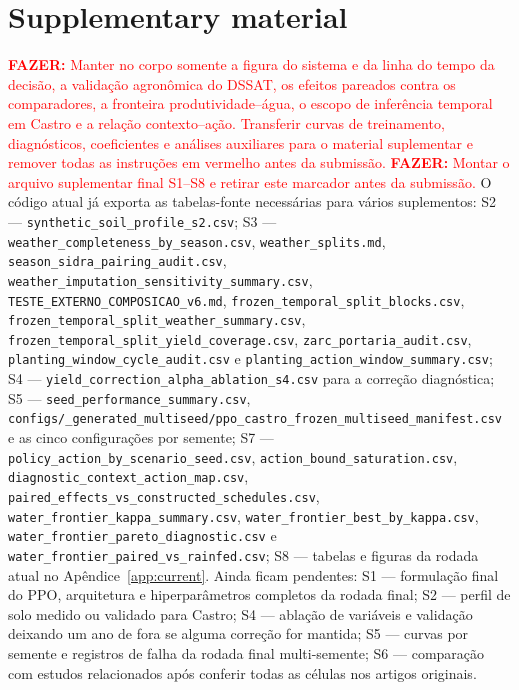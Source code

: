 \documentclass[times,final,authoryear]{elsarticle}
\begin{document}
\section*{Supplementary material}
\textcolor{red}{\textbf{FAZER:} Manter no corpo somente a figura do sistema e da linha do tempo da decisão, a validação agronômica do DSSAT, os efeitos pareados contra os comparadores, a fronteira produtividade--água, o escopo de inferência temporal em Castro e a relação contexto--ação. Transferir curvas de treinamento, diagnósticos, coeficientes e análises auxiliares para o material suplementar e remover todas as instruções em vermelho antes da submissão.}
\textcolor{red}{\textbf{FAZER:} Montar o arquivo suplementar final S1--S8 e retirar este marcador antes da submissão.} O código atual já exporta as tabelas-fonte necessárias para vários suplementos: S2 --- \texttt{synthetic\_soil\_profile\_s2.csv}; S3 --- \texttt{weather\_completeness\_by\_season.csv}, \texttt{weather\_splits.md}, \texttt{season\_sidra\_pairing\_audit.csv}, \texttt{weather\_imputation\_sensitivity\_summary.csv}, \texttt{TESTE\_EXTERNO\_COMPOSICAO\_v6.md}, \texttt{frozen\_temporal\_split\_blocks.csv}, \texttt{frozen\_temporal\_split\_weather\_summary.csv}, \texttt{frozen\_temporal\_split\_yield\_coverage.csv}, \texttt{zarc\_portaria\_audit.csv}, \texttt{planting\_window\_cycle\_audit.csv} e \texttt{planting\_action\_window\_summary.csv}; S4 --- \texttt{yield\_correction\_alpha\_ablation\_s4.csv} para a correção diagnóstica; S5 --- \texttt{seed\_performance\_summary.csv}, \texttt{configs/\_generated\_multiseed/ppo\_castro\_frozen\_multiseed\_manifest.csv} e as cinco configurações por semente; S7 --- \texttt{policy\_action\_by\_scenario\_seed.csv}, \texttt{action\_bound\_saturation.csv}, \texttt{diagnostic\_context\_action\_map.csv}, \texttt{paired\_effects\_vs\_constructed\_schedules.csv}, \texttt{water\_frontier\_kappa\_summary.csv}, \texttt{water\_frontier\_best\_by\_kappa.csv}, \texttt{water\_frontier\_pareto\_diagnostic.csv} e \texttt{water\_frontier\_paired\_vs\_rainfed.csv}; S8 --- tabelas e figuras da rodada atual no Apêndice~\ref{app:current}. Ainda ficam pendentes: S1 --- formulação final do PPO, arquitetura e hiperparâmetros completos da rodada final; S2 --- perfil de solo medido ou validado para Castro; S4 --- ablação de variáveis e validação deixando um ano de fora se alguma correção for mantida; S5 --- curvas por semente e registros de falha da rodada final multi-semente; S6 --- comparação com estudos relacionados após conferir todas as células nos artigos originais.





\end{document}
